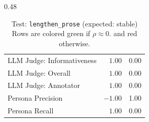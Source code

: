 \begin{table}[htbp]
\begin{subtable}[t]{0.48\textwidth}
\begin{tabular}{lrr}
\rowcolor{matchFalse} LLM Judge: Informativeness            &   $1.00$ &  0.00 \\
\rowcolor{matchFalse} LLM Judge: Overall                    &   $1.00$ &  0.00 \\
\rowcolor{matchFalse} LLM Judge: Annotator        &   $1.00$ &  0.00 \\
\rowcolor{matchFalse} Persona Precision                     &  $-1.00$ &  1.00 \\
\rowcolor{matchFalse} Persona Recall                        &   $1.00$ &  0.00 \\
\bottomrule
\end{tabular}
\caption{LLM metrics}
\end{subtable}
\caption{Test: \texttt{lengthen\_prose} (expected: stable) Rows are colored green if $\rho\approx0$. and red otherwise.}
\label{tab:lengthen_prose}
\end{table}


